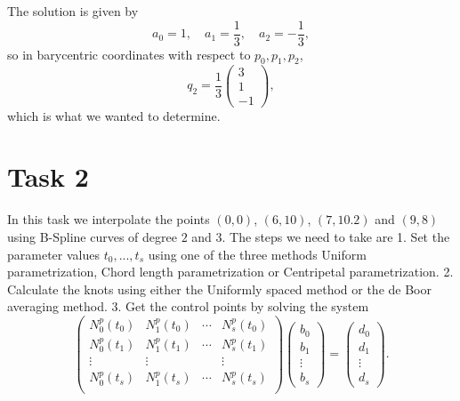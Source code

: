 \documentclass[]{article}
\begin{document}
The solution is given by \begin{equation*}
a_0 = 1, \quad a_1 = \frac{1}{3}, \quad a_2 = -\frac{1}{3},
\end{equation*}
so in barycentric coordinates with respect to $p_0, p_1, p_2$, \begin{equation*}
q_2 = \frac{1}{3}\left(\begin{array}{r}
3\\
1\\
-1
\end{array}\right),
\end{equation*}
which is what we wanted to determine.

\section*{Task 2}
In this task we interpolate the points $(0,0)$, $(6,10)$, $(7,10.2)$ and $(9,8)$ using B-Spline curves of degree $2$ and $3$. The steps we need to take are
1. Set the parameter values $t_0,...,t_s$ using one of the three methods Uniform parametrization, Chord length parametrization or Centripetal parametrization.
2. Calculate the knots using either the Uniformly spaced method or the de Boor averaging method.	
3. Get the control points by solving the system
\begin{equation*}
\left(\begin{array}{cccc}
N^p_0(t_0) & N^p_1(t_0) & \cdots & N^p_s(t_0)\\
N^p_0(t_1) & N^p_1(t_1) & \cdots & N^p_s(t_1)\\
\vdots & \vdots & & \vdots\\
N^p_0(t_s) & N^p_1(t_s) & \cdots & N^p_s(t_s)\\
\end{array}\right)\left(\begin{array}{c}
b_0\\
b_1\\
\vdots \\
b_s
\end{array}\right) = \left(\begin{array}{c}
d_0\\
d_1\\
\vdots \\
d_s
\end{array}\right).
\end{equation*}
\end{document}
